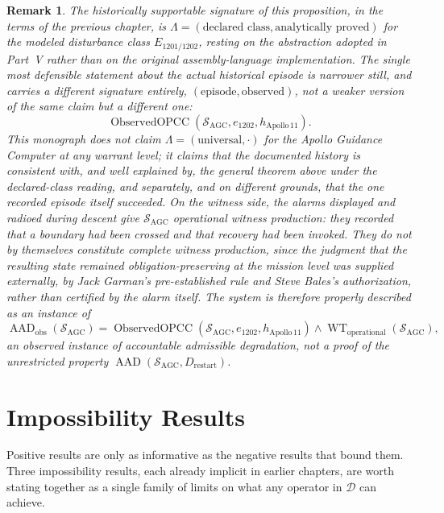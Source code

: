 \documentclass[11pt]{report}
\newtheorem{remark}[definition]{Remark}
\begin{document}
\begin{remark}
The historically supportable signature of this proposition, in the terms of the previous chapter, is $\Lambda = (\text{declared class}, \text{analytically proved})$ for the modeled disturbance class $E_{1201/1202}$, resting on the abstraction adopted in Part~V rather than on the original assembly-language implementation. The single most defensible statement about the actual historical episode is narrower still, and carries a different signature entirely, $(\text{episode}, \text{observed})$, not a weaker version of the same claim but a different one:
\[
\operatorname{ObservedOPCC}(\mathcal S_{\mathrm{AGC}}, e_{1202}, h_{\mathrm{Apollo\,11}}).
\]
This monograph does not claim $\Lambda = (\text{universal}, \cdot)$ for the Apollo Guidance Computer at any warrant level; it claims that the documented history is consistent with, and well explained by, the general theorem above under the declared-class reading, and separately, and on different grounds, that the one recorded episode itself succeeded. On the witness side, the alarms displayed and radioed during descent give $\mathcal S_{\mathrm{AGC}}$ operational witness production: they recorded that a boundary had been crossed and that recovery had been invoked. They do not by themselves constitute complete witness production, since the judgment that the resulting state remained obligation-preserving at the mission level was supplied externally, by Jack Garman's pre-established rule and Steve Bales's authorization, rather than certified by the alarm itself. The system is therefore properly described as an instance of
\[
\operatorname{AAD}_{\mathrm{obs}}(\mathcal S_{\mathrm{AGC}}) = \operatorname{ObservedOPCC}(\mathcal S_{\mathrm{AGC}}, e_{1202}, h_{\mathrm{Apollo\,11}}) \land \operatorname{WT}_{\mathrm{operational}}(\mathcal S_{\mathrm{AGC}}),
\]
an observed instance of accountable admissible degradation, not a proof of the unrestricted property $\operatorname{AAD}(\mathcal S_{\mathrm{AGC}}, D_{\mathrm{restart}})$.
\end{remark}

\chapter{Impossibility Results}

Positive results are only as informative as the negative results that bound them. Three impossibility results, each already implicit in earlier chapters, are worth stating together as a single family of limits on what any operator in $\mathcal D$ can achieve.
\end{document}
